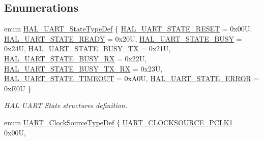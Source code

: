\subsection*{Enumerations}
\begin{DoxyCompactItemize}
\item 
enum \hyperlink{group___u_a_r_t___exported___types_gaf55d844a35379c204c90be5d1e8e50ba}{H\+A\+L\+\_\+\+U\+A\+R\+T\+\_\+\+State\+Type\+Def} \{ \newline
\hyperlink{group___u_a_r_t___exported___types_ggaf55d844a35379c204c90be5d1e8e50baa9c7d889fce61ccc717228d099a61d113}{H\+A\+L\+\_\+\+U\+A\+R\+T\+\_\+\+S\+T\+A\+T\+E\+\_\+\+R\+E\+S\+ET} = 0x00U, 
\hyperlink{group___u_a_r_t___exported___types_ggaf55d844a35379c204c90be5d1e8e50baade763629c1bdb4f08e52ef79d6e0900e}{H\+A\+L\+\_\+\+U\+A\+R\+T\+\_\+\+S\+T\+A\+T\+E\+\_\+\+R\+E\+A\+DY} = 0x20U, 
\hyperlink{group___u_a_r_t___exported___types_ggaf55d844a35379c204c90be5d1e8e50baad1eddce038ba828e8b4061a33a2d8801}{H\+A\+L\+\_\+\+U\+A\+R\+T\+\_\+\+S\+T\+A\+T\+E\+\_\+\+B\+U\+SY} = 0x24U, 
\hyperlink{group___u_a_r_t___exported___types_ggaf55d844a35379c204c90be5d1e8e50baadc97ca42e9b05a08cb98e6721e27e80c}{H\+A\+L\+\_\+\+U\+A\+R\+T\+\_\+\+S\+T\+A\+T\+E\+\_\+\+B\+U\+S\+Y\+\_\+\+TX} = 0x21U, 
\newline
\hyperlink{group___u_a_r_t___exported___types_ggaf55d844a35379c204c90be5d1e8e50baaf7929f7aebd6b450c25907904411680b}{H\+A\+L\+\_\+\+U\+A\+R\+T\+\_\+\+S\+T\+A\+T\+E\+\_\+\+B\+U\+S\+Y\+\_\+\+RX} = 0x22U, 
\hyperlink{group___u_a_r_t___exported___types_ggaf55d844a35379c204c90be5d1e8e50baa2fdde93f9f55972b7133bf7c75dd2e8a}{H\+A\+L\+\_\+\+U\+A\+R\+T\+\_\+\+S\+T\+A\+T\+E\+\_\+\+B\+U\+S\+Y\+\_\+\+T\+X\+\_\+\+RX} = 0x23U, 
\hyperlink{group___u_a_r_t___exported___types_ggaf55d844a35379c204c90be5d1e8e50baa90891eeb767df19780e620a15bec807d}{H\+A\+L\+\_\+\+U\+A\+R\+T\+\_\+\+S\+T\+A\+T\+E\+\_\+\+T\+I\+M\+E\+O\+UT} = 0x\+A0U, 
\hyperlink{group___u_a_r_t___exported___types_ggaf55d844a35379c204c90be5d1e8e50baa5d50bfe0750db02c4fd03d778c8c318c}{H\+A\+L\+\_\+\+U\+A\+R\+T\+\_\+\+S\+T\+A\+T\+E\+\_\+\+E\+R\+R\+OR} = 0x\+E0U
 \}\begin{DoxyCompactList}\small\item\em H\+AL U\+A\+RT State structures definition. \end{DoxyCompactList}
\item 
enum \hyperlink{group___u_a_r_t___exported___types_gad957348fe227e5cb75b70be026c5ae81}{U\+A\+R\+T\+\_\+\+Clock\+Source\+Type\+Def} \{ \newline
\hyperlink{group___u_a_r_t___exported___types_ggad957348fe227e5cb75b70be026c5ae81a96ac2df7b663207f2e8be97e0e18a3bb}{U\+A\+R\+T\+\_\+\+C\+L\+O\+C\+K\+S\+O\+U\+R\+C\+E\+\_\+\+P\+C\+L\+K1} = 0x00U, 

\end{DoxyCompactItemize}
